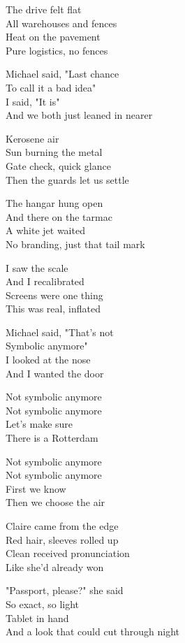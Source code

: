 \begin{lyrics}
The drive felt flat\\
All warehouses and fences\\
Heat on the pavement\\
Pure logistics, no fences

Michael said, "Last chance\\
To call it a bad idea"\\
I said, "It is"\\
And we both just leaned in nearer

Kerosene air\\
Sun burning the metal\\
Gate check, quick glance\\
Then the guards let us settle

The hangar hung open\\
And there on the tarmac\\
A white jet waited\\
No branding, just that tail mark

I saw the scale\\
And I recalibrated\\
Screens were one thing\\
This was real, inflated

Michael said, "That’s not\\
Symbolic anymore"\\
I looked at the nose\\
And I wanted the door

Not symbolic anymore\\
Not symbolic anymore\\
Let’s make sure\\
There is a Rotterdam

Not symbolic anymore\\
Not symbolic anymore\\
First we know\\
Then we choose the air

Claire came from the edge\\
Red hair, sleeves rolled up\\
Clean received pronunciation\\
Like she’d already won

"Passport, please?" she said\\
So exact, so light\\
Tablet in hand\\
And a look that could cut through night


\end{lyrics}
